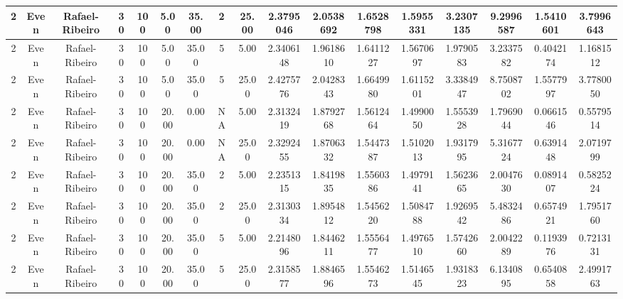 \begin{longtable}{ | c | c | c | c | c | c | c | c | c | c | c | c | c | c | c | c | c | }
	\hline
	2	&	Even	&	Rafael-Ribeiro	&	30	&	100	&	5.00	&	35.00	&	2	&	25.00	&	2.3795046	&	2.0538692	&	1.6528798	&	1.5955331	&	3.2307135	&	9.2996587	&	1.5410601	&	3.7996643 \\
	\hline
	2	&	Even	&	Rafael-Ribeiro	&	30	&	100	&	5.00	&	35.00	&	5	&	5.00	&	2.3406148	&	1.9618610	&	1.6411227	&	1.5670697	&	1.9790583	&	3.2337582	&	0.4042174	&	1.1681512 \\
	\hline
	2	&	Even	&	Rafael-Ribeiro	&	30	&	100	&	5.00	&	35.00	&	5	&	25.00	&	2.4275776	&	2.0428343	&	1.6649980	&	1.6115201	&	3.3384947	&	8.7508702	&	1.5577997	&	3.7780050 \\
	\hline
	2	&	Even	&	Rafael-Ribeiro	&	30	&	100	&	20.00	&	0.00	&	NA	&	5.00	&	2.3132419	&	1.8792768	&	1.5612464	&	1.4990050	&	1.5553928	&	1.7969044	&	0.0661546	&	0.5579514 \\
	\hline
	2	&	Even	&	Rafael-Ribeiro	&	30	&	100	&	20.00	&	0.00	&	NA	&	25.00	&	2.3292455	&	1.8706332	&	1.5447387	&	1.5102013	&	1.9317995	&	5.3167724	&	0.6391448	&	2.0719799 \\
	\hline
	2	&	Even	&	Rafael-Ribeiro	&	30	&	100	&	20.00	&	35.00	&	2	&	5.00	&	2.2351315	&	1.8419835	&	1.5560386	&	1.4979141	&	1.5623665	&	2.0047630	&	0.0891407	&	0.5825224 \\
	\hline
	2	&	Even	&	Rafael-Ribeiro	&	30	&	100	&	20.00	&	35.00	&	2	&	25.00	&	2.3130334	&	1.8954812	&	1.5456220	&	1.5084788	&	1.9269542	&	5.4832486	&	0.6574921	&	1.7951760 \\
	\hline
	2	&	Even	&	Rafael-Ribeiro	&	30	&	100	&	20.00	&	35.00	&	5	&	5.00	&	2.2148096	&	1.8446211	&	1.5556477	&	1.4976510	&	1.5742660	&	2.0042289	&	0.1193976	&	0.7213131 \\
	\hline
	2	&	Even	&	Rafael-Ribeiro	&	30	&	100	&	20.00	&	35.00	&	5	&	25.00	&	2.3158577	&	1.8846596	&	1.5546273	&	1.5146545	&	1.9318323	&	6.1340895	&	0.6540858	&	2.4991763 \\
	\hline
\end{longtable}
\label{tab:results}
